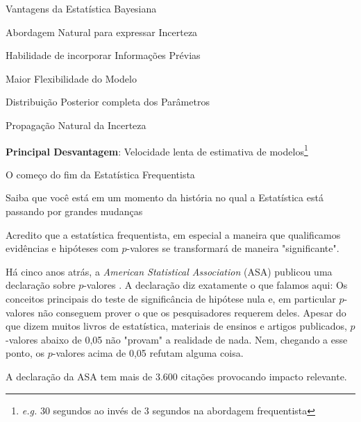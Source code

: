 \begin{frame}{Vantagens da Estatística Bayesiana}
	\begin{vfilleditems}
		\item Abordagem Natural para expressar Incerteza
		\item Habilidade de incorporar Informações Prévias
		\item Maior Flexibilidade do Modelo
		\item Distribuição Posterior completa dos Parâmetros
		\item Propagação Natural da Incerteza
	\end{vfilleditems}
	\small \textbf{Principal Desvantagem}: Velocidade lenta de estimativa de modelos\footnote{\textit{e.g.} 30 segundos ao invés de 3 segundos na abordagem frequentista}
\end{frame}

\begin{frame}{O começo do fim da Estatística Frequentista}
	\begin{vfilleditems}
		\small
		\item Saiba que você está em um momento da história no qual a Estatística está passando por grandes mudanças
		\item Acredito que a estatística frequentista, em especial a maneira que qualificamos evidências e hipóteses
		com $p$-valores se transformará de maneira "significante".
		\item Há cinco anos atrás, a \textit{American Statistical Association} (ASA) publicou uma declaração sobre
		$p$-valores \parencite{Wasserstein2016}. A declaração diz exatamente o que falamos aqui: Os conceitos principais do teste de significância de hipótese nula e, em particular $p$-valores não conseguem prover o que os pesquisadores requerem deles. Apesar do que dizem muitos livros de estatística, materiais de ensinos e artigos publicados, $p$-valores abaixo de 0,05 não "provam" a realidade de nada. Nem, chegando a esse ponto, os $p$-valores acima de 0,05 refutam alguma coisa.
		\item A declaração da ASA tem mais de 3.600 citações provocando impacto relevante.
	\end{vfilleditems}
\end{frame}

